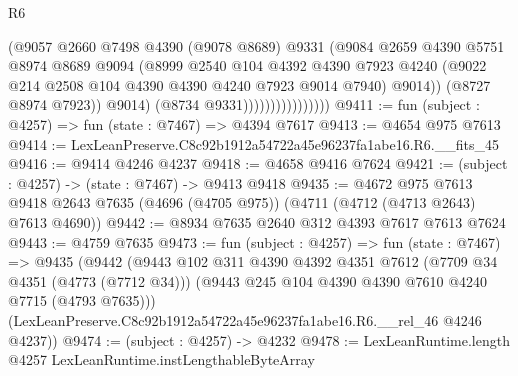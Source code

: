 \begin{lexlean}{R6}
\begin{coremodule}
                                    (@9057
                                      @2660
                                      @7498
                                      @4390
                                      (@9078 @8689)
                                      @9331
                                      (@9084
                                        @2659
                                        @4390
                                        @5751
                                        @8974
                                        @8689
                                        @9094
                                        (@8999
                                          @2540
                                          @104
                                          @4392
                                          @4390
                                          @7923
                                          @4240
                                          (@9022
                                            @214
                                            @2508
                                            @104
                                            @4390
                                            @4390
                                            @4240
                                            @7923
                                            @9014
                                            @7940)
                                          @9014))
                                      (@8727 @8974 @7923))
                                    @9014)
                                  (@8734 @9331))))))))))))))))
@9411 := fun (subject : @4257) => fun (state : @7467) => @4394 @7617
@9413 := @4654 @975 @7613
@9414 := LexLeanPreserve.C8c92b1912a54722a45e96237fa1abe16.R6.__fits_45
@9416 := @9414 @4246 @4237
@9418 := @4658 @9416 @7624
@9421 := (subject : @4257) -> (state : @7467) -> @9413 @9418
@9435 := @4672
    @975
    @7613
    @9418
    @2643
    @7635
    (@4696 (@4705 @975))
    (@4711 (@4712 (@4713 @2643) @7613 @4690))
@9442 := @8934 @7635 @2640 @312 @4393 @7617 @7613 @7624
@9443 := @4759 @7635
@9473 := fun (subject : @4257) =>
  fun (state : @7467) =>
  @9435
    (@9442
      (@9443
        @102
        @311
        @4390
        @4392
        @4351
        @7612
        (@7709 @34 @4351 (@4773 (@7712 @34)))
        (@9443 @245 @104 @4390 @4390 @7610 @4240 @7715 (@4793 @7635)))
      (LexLeanPreserve.C8c92b1912a54722a45e96237fa1abe16.R6.__rel_46 @4246 @4237))
@9474 := (subject : @4257) -> @4232
@9478 := LexLeanRuntime.length @4257 LexLeanRuntime.instLengthableByteArray

\end{coremodule}
\end{lexlean}
